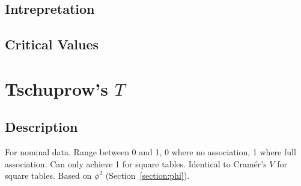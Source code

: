 \documentclass[11pt]{article}
\begin{document}
\subsection{Intrepretation}

\subsection{Critical Values}














\section{Tschuprow's $T$}
\label{section:tschuprowt}
\subsection{Description}
For nominal data.  
Range between 0 and 1, 0 where no association, 1 where full association.  
Can only achieve 1 for square tables. 
Identical to Cram\'er's $V$ for square tables.  
Based on $\phi^2$ (Section~\ref{section:phi}).
\end{document}
